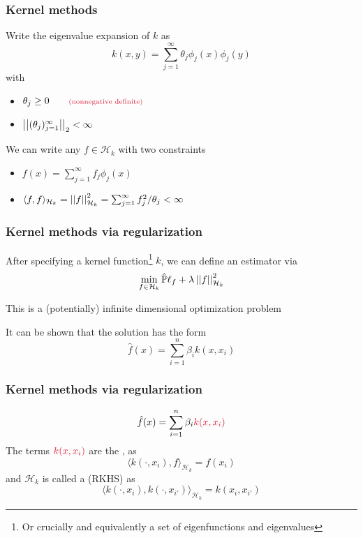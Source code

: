 \documentclass[12pt]{beamer}
\newcommand{\parenthetical}[2]{#1  \scriptstyle \alr{( #2)}}
\begin{document}
\begin{frame}
\frametitle{Kernel methods}
Write the eigenvalue expansion of $k$ as
\[
k(x,y) = \sum_{j=1}^\infty \theta_j \phi_j(x)\phi_j(y)
\]
with

\begin{itemize}
\item $\theta_j \geq 0 \parenthetical{\qquad}{\textrm{nonnegative definite}}$
\item $\left|\left| (\theta_j)_{j=1}^\infty \right|\right|_2 < \infty$
\end{itemize}
\vsp

We can write any $f \in \mathcal{H}_k$ with two constraints
\begin{itemize}
\item $f(x) = \sum_{j=1}^\infty f_j \phi_j(x)$
\item $\langle f, f \rangle_{\mathcal{H}_k} = \left|\left| f \right|\right|_{\mathcal{H}_k}^2 = \sum_{j=1}^\infty f_j^2/\theta_j < \infty$
\end{itemize}
\end{frame}

\begin{frame}
\frametitle{Kernel methods via regularization}
After specifying a kernel function\footnote{Or crucially and equivalently a set of eigenfunctions and
eigenvalues} $k$, we can define an estimator via
\[
\min_{f \in \mathcal{H}_k} \hat{\mathbb{P}} \ell_f + \lambda \left|\left| f \right|\right|_{\mathcal{H}_k}^2
\]

\vsp
This is a (potentially) infinite dimensional optimization problem 


\vsp
It can be shown that the solution has the form
\[
\hat{f}(x) = \sum_{i=1}^n \beta_i k(x,x_i)
\]
\end{frame}

\begin{frame}
\frametitle{Kernel methods via regularization}

\[
\hat{f}(x) = \sum_{i=1}^n \beta_i \alr{k(x,x_i)}
\]
The terms $\alr{k(x,x_i)}$ are the , as
\[
\langle k(\cdot,x_i), f \rangle_{\mathcal{H}_k} = f(x_i)
\]
and $\mathcal{H}_k$ is called a  (RKHS) as
\[
\langle k(\cdot,x_i),k(\cdot,x_{i'}) \rangle_{\mathcal{H}_k} = k(x_i,x_{i'})
\]
\end{frame}
\end{document}
